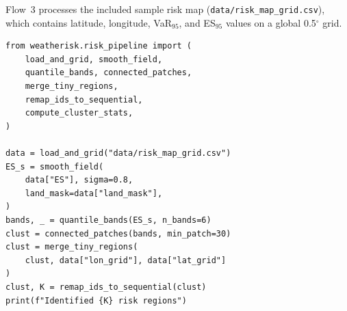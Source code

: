 \documentclass[a4paper]{elsarticle}
\begin{document}
Flow~3 processes the included sample risk map
(\texttt{data/risk\_map\_grid.csv}), which contains latitude, longitude,
VaR$_{95}$, and ES$_{95}$ values on a global 0.5$^\circ$ grid.

\begin{lstlisting}[caption={Risk pipeline post-processing.},label=lst:postproc]
from weatherisk.risk_pipeline import (
    load_and_grid, smooth_field,
    quantile_bands, connected_patches,
    merge_tiny_regions,
    remap_ids_to_sequential,
    compute_cluster_stats,
)

data = load_and_grid("data/risk_map_grid.csv")
ES_s = smooth_field(
    data["ES"], sigma=0.8,
    land_mask=data["land_mask"],
)
bands, _ = quantile_bands(ES_s, n_bands=6)
clust = connected_patches(bands, min_patch=30)
clust = merge_tiny_regions(
    clust, data["lon_grid"], data["lat_grid"]
)
clust, K = remap_ids_to_sequential(clust)
print(f"Identified {K} risk regions")
\end{lstlisting}

\end{document}
